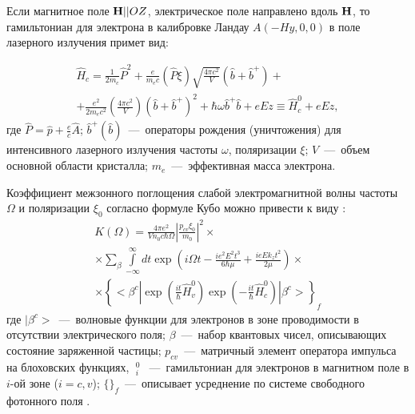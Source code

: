 Если магнитное поле $\boldsymbol{\mathbf{H}}||OZ$, электрическое поле направлено вдоль $\boldsymbol{\mathbf{H}}$, то гамильтониан для электрона в калибровке Ландау $A(-Hy,0,0)$ в поле лазерного излучения примет вид:

\begin{multline} \label{eq:22_10} 
\hat{H}_c =\frac{1}{2m_c } \hat{P}^2 +\frac{e}{m_e c} (\hat{P}\xi )\sqrt{\frac{4\pi c^2 }{V} } (\hat{b}+\hat{b}^+ ) + \\ 
+\frac{e^{2} }{2m_e c^2 } \left(\frac{4\pi c^{2} }{V} \right)(\hat{b}+\hat{b}^+ )^2 +\hbar \omega \hat{b}^+ \hat{b}+eEz\equiv \hat{H}_c^0 +eEz,
\end{multline}
где $\hat{P}=\hat{p}+\frac{e}{c} \hat{A}$; $\hat{b}^+ (\hat{b})$~---~операторы рождения (уничтожения) для интенсивного лазерного излучения частоты $\omega $, поляризации $\xi $; $V$~---~объем основной области кристалла; $m_e $~---~эффективная масса электрона.

Коэффициент межзонного поглощения слабой электромагнитной волны частоты $\Omega $ и поляризации $\xi _{0} $ согласно формуле Кубо \cite{Kubo1957a} можно привести к виду \cite{Sokovnich2004}:
\begin{multline} \label{eq:22_20} 
K(\Omega )=\frac{4\pi e^2 }{V n_0 c\hbar \Omega } \left|\frac{p_{cv} \xi_0 }{m_0 } \right|^2 \times  \\
\times \sum _{\beta } \int\limits_{-\infty }^{\infty} dt \exp \left(i\Omega t-\frac{i e^2 E^2 t^3 }{6\hbar \mu } +\frac{ieEk_z t^2}{2\mu } \right)\times  \\ 
\times \left\{<\beta^c |\exp \left(\frac{it}{\hbar } \hat{H}_v^0 \right)\exp \left(-\frac{it}{\hbar } \hat{H}_c^0 \right)|\beta^c >\right\}_f  
\end{multline} 
где $|\beta^c >$~---~волновые функции для электронов в зоне проводимости в отсутствии электрического поля; $\beta $~---~набор квантовых чисел, описывающих состояние заряженной частицы; $p_{cv} $~---~матричный элемент оператора импульса на блоховских функциях, $\mathop{\hat{H}}\nolimits_i^0 $~---~гамильтониан для электронов в магнитном поле в $i$-ой зоне ($i=c,v$); $\{ \}_f$~---~описывает усреднение по системе свободного фотонного поля \cite{Glauber1963,Klauder1968}. 


